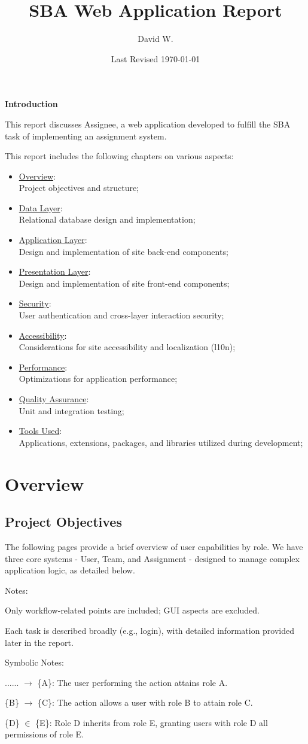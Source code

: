 \documentclass[12pt]{report}
\title{SBA Web Application Report}
\author{David W.}
\date{Last Revised \today}
\newcommand{\n}{\par}
\newcommand{\br}{\n\vspace{1 em}\n}
\begin{document}
\maketitle

\textbf{Introduction}
\br
This report discusses Assignee, a web application developed to fulfill the SBA task of implementing an assignment system.
\br
This report includes the following chapters on various aspects:
\begin{itemize}
	\item \hyperref[overview]{Overview}:\\
	      Project objectives and structure;
	\item \hyperref[data-layer]{Data Layer}:\\
	      Relational database design and implementation;
	\item \hyperref[application-layer]{Application Layer}:\\
	      Design and implementation of site back-end components;
	\item \hyperref[presentation-layer]{Presentation Layer}:\\
	      Design and implementation of site front-end components;
	\item \hyperref[security]{Security}:\\
	      User authentication and cross-layer interaction security;
	\item \hyperref[accessibility]{Accessibility}:\\
	      Considerations for site accessibility and localization (l10n);
	\item \hyperref[performance]{Performance}:\\
	      Optimizations for application performance;
	\item \hyperref[quality-assurance]{Quality Assurance}:\\
	      Unit and integration testing;
	\item \hyperref[tools-used]{Tools Used}:\\
	      Applications, extensions, packages, and libraries utilized during development;
\end{itemize}
\tableofcontents

\chapter{Overview} \label{overview}
\section{Project Objectives} \label{overview.project-objectives}
The following pages provide a brief overview of user capabilities by role.
We have three core systems - User, Team, and Assignment - designed to manage complex application logic, as detailed below.
\br
Notes:\n
Only workflow-related points are included; GUI aspects are excluded.\n
Each task is described broadly (e.g., login), with detailed information provided later in the report.
\br
Symbolic Notes:\n
...... $\rightarrow$ \{A\}: The user performing the action attains role A.\n
\{B\} $\rightarrow$ \{C\}: The action allows a user with role B to attain role C.\n
\{D\} $\in$ \{E\}: Role D inherits from role E, granting users with role D all permissions of role E.
\end{document}
